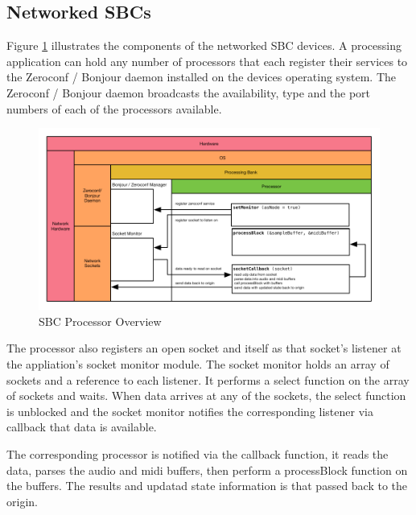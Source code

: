 \subsection{Networked SBCs}

Figure \ref{fig:arch_03} illustrates the components of the networked SBC devices. A processing application can hold any number of processors that each register their services to the Zeroconf / Bonjour daemon installed on the devices operating system. The Zeroconf / Bonjour daemon broadcasts the availability, type and the port numbers of each of the processors available.

\begin{figure}[H]
    \centering
    \includegraphics[width=\textwidth]{assets/architecture_03.pdf}
    \caption{SBC Processor Overview}
    \label{fig:arch_03}
\end{figure}



The processor also registers an open socket and itself as that socket's listener at the appliation's socket monitor module. The socket monitor holds an array of sockets and a reference to each listener. It performs a select function on the array of sockets and waits. When data arrives at any of the sockets, the select function is unblocked and the socket monitor notifies the corresponding listener via callback that data is available.

The corresponding processor is notified via the callback function, it reads the data, parses the audio and midi buffers, then perform a processBlock function on the buffers. The results and updatad state information is that passed back to the origin.

